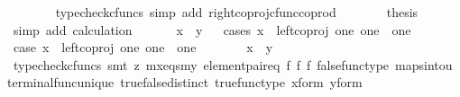 \begin{isabellebody}
\ \ \ \ \ \ \isamarkupfalse%
\ {\isacharparenleft}{\kern0pt}typecheck{\isacharunderscore}{\kern0pt}cfuncs{\isacharcomma}{\kern0pt}\ simp\ add{\isacharcolon}{\kern0pt}\ right{\isacharunderscore}{\kern0pt}coproj{\isacharunderscore}{\kern0pt}cfunc{\isacharunderscore}{\kern0pt}coprod{\isacharparenright}{\kern0pt}\isanewline
\ \ \ \ \isamarkupfalse%
\ \isamarkupfalse%
\ {\isacharquery}{\kern0pt}thesis\isanewline
\ \ \ \ \ \ \isamarkupfalse%
\ {\isacharparenleft}{\kern0pt}simp\ add{\isacharcolon}{\kern0pt}\ calculation{\isacharparenright}{\kern0pt}\isanewline
\ \ \isamarkupfalse%
\isanewline
\ \ \isamarkupfalse%
\ {\isachardoublequoteopen}x\ {\isacharequal}{\kern0pt}\ y{\isachardoublequoteclose}\isanewline
\ \ \isamarkupfalse%
{\isacharparenleft}{\kern0pt}cases\ {\isachardoublequoteopen}x\ {\isacharequal}{\kern0pt}\ left{\isacharunderscore}{\kern0pt}coproj\ one\ {\isacharparenleft}{\kern0pt}one\ {\isasymCoprod}\ one{\isacharparenright}{\kern0pt}{\isachardoublequoteclose}{\isacharparenright}{\kern0pt}\isanewline
\ \ \ \ \isamarkupfalse%
\ case{}{\isacharcolon}{\kern0pt}\ {\isachardoublequoteopen}x\ {\isacharequal}{\kern0pt}\ left{\isacharunderscore}{\kern0pt}coproj\ one\ {\isacharparenleft}{\kern0pt}one\ {\isasymCoprod}\ one{\isacharparenright}{\kern0pt}{\isachardoublequoteclose}\isanewline
\ \ \ \ \isamarkupfalse%
\ \isamarkupfalse%
\ {\isachardoublequoteopen}x\ {\isacharequal}{\kern0pt}\ y{\isachardoublequoteclose}\isanewline
\ \ \ \ \ \ \isamarkupfalse%
\ {\isacharparenleft}{\kern0pt}typecheck{\isacharunderscore}{\kern0pt}cfuncs{\isacharcomma}{\kern0pt}\ smt\ {\isacharparenleft}{\kern0pt}z{}{\isacharparenright}{\kern0pt}\ mx{\isacharunderscore}{\kern0pt}eqs{\isacharunderscore}{\kern0pt}my\ element{\isacharunderscore}{\kern0pt}pair{\isacharunderscore}{\kern0pt}eq\ f{}\ f{}\ f{}\ false{\isacharunderscore}{\kern0pt}func{\isacharunderscore}{\kern0pt}type\ maps{\isacharunderscore}{\kern0pt}into{\isacharunderscore}{\kern0pt}{}u{}\ terminal{\isacharunderscore}{\kern0pt}func{\isacharunderscore}{\kern0pt}unique\ true{\isacharunderscore}{\kern0pt}false{\isacharunderscore}{\kern0pt}distinct\ true{\isacharunderscore}{\kern0pt}func{\isacharunderscore}{\kern0pt}type\ x{\isacharunderscore}{\kern0pt}form\ y{\isacharunderscore}{\kern0pt}form{\isacharparenright}{\kern0pt}\isanewline
\ \ \isamarkupfalse%

\end{isabellebody}
